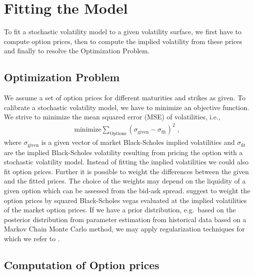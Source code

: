 \documentclass[10pt,a4paper]{article}
\numberwithin{equation}{section} %
\theoremstyle{plain}
\theoremstyle{definition}
\theoremstyle{remark}
\begin{document}
\section{Fitting the Model}
\label{sec:FittingtheModel}

To fit a stochastic volatility model to a given volatility surface, we first have to compute option prices, then to compute the implied volatility from these prices and finally to resolve the Optimization Problem.



\subsection{Optimization Problem}
\label{subsec:Optimization_Problem}

We assume a set of option prices for different maturities and strikes as given.
To calibrate a stochastic volatility model, we have to minimize an objective function. We strive to minimize the mean squared error (MSE) of  volatilities, i.e.,
\begin{align*}
\text{minimize}\sum_{\text{Options}}(\sigma_{\text{given}}-\sigma_{\text{fit}})^2\;,
\end{align*}
where $\sigma_{\text{given}}$ is a given vector of market Black-Scholes implied volatilities  and $\sigma_{\text{fit}}$ are the implied Black-Scholes volatility resulting from pricing the option with a stochastic volatility model. 
Instead of fitting the implied volatilities we could also fit option prices. Further it is possible to weight the differences between the given and the fitted prices. The choice of the weights may depend on the liquidity of a given option which can be assessed from the bid-ask spread. \cite[Chapter~13]{Co04} suggest to weight the option prices by squared Black-Scholes vegas evaluated at the implied volatilities of the market option prices. 
If we have a prior distribution, e.g.\ based on the posterior distribution from parameter estimation from historical data  based on a Markov Chain Monte Carlo method, we may apply regularization techniques for which we refer to \cite[Chapter~13]{Co04}.


\subsection{Computation of Option prices}
\label{subsec:Computation_of_Option_prices}
\end{document}
